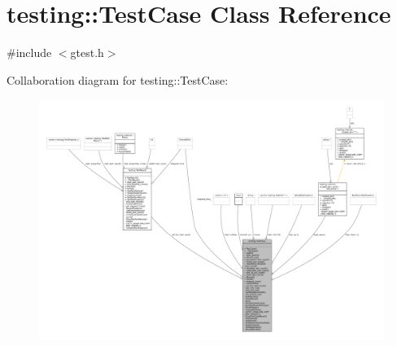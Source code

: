 \hypertarget{classtesting_1_1TestCase}{}\section{testing\+:\+:Test\+Case Class Reference}
\label{classtesting_1_1TestCase}


{\ttfamily \#include $<$gtest.\+h$>$}



Collaboration diagram for testing\+:\+:Test\+Case\+:
\nopagebreak
\begin{figure}[H]
\begin{center}
\leavevmode
\includegraphics[width=350pt]{classtesting_1_1TestCase__coll__graph}
\end{center}
\end{figure}
